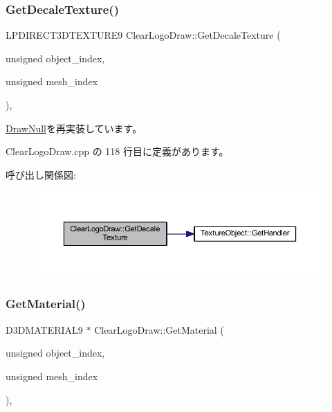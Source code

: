 \subsubsection{\texorpdfstring{Get\+Decale\+Texture()}{GetDecaleTexture()}}
{\footnotesize\ttfamily L\+P\+D\+I\+R\+E\+C\+T3\+D\+T\+E\+X\+T\+U\+R\+E9 Clear\+Logo\+Draw\+::\+Get\+Decale\+Texture (\begin{DoxyParamCaption}\item[{unsigned}]{object\+\_\+index,  }\item[{unsigned}]{mesh\+\_\+index }\end{DoxyParamCaption})\hspace{0.3cm}{\ttfamily [override]}, {\ttfamily [virtual]}}



\mbox{\hyperlink{class_draw_null_a8496ed1b1f765a331a8f1704122b8ca4}{Draw\+Null}}を再実装しています。



 Clear\+Logo\+Draw.\+cpp の 118 行目に定義があります。

呼び出し関係図\+:\nopagebreak
\begin{figure}[H]
\begin{center}
\leavevmode
\includegraphics[width=350pt]{class_clear_logo_draw_a04ae25ae9cb59df0d0c346b65baed3f2_cgraph}
\end{center}
\end{figure}
\mbox{\label{class_clear_logo_draw_ab356bf5d56c10a6689e101b35c30d889}} 
\subsubsection{\texorpdfstring{Get\+Material()}{GetMaterial()}}
{\footnotesize\ttfamily D3\+D\+M\+A\+T\+E\+R\+I\+A\+L9 $\ast$ Clear\+Logo\+Draw\+::\+Get\+Material (\begin{DoxyParamCaption}\item[{unsigned}]{object\+\_\+index,  }\item[{unsigned}]{mesh\+\_\+index }\end{DoxyParamCaption})\hspace{0.3cm}{\ttfamily [override]}, {\ttfamily [virtual]}}



